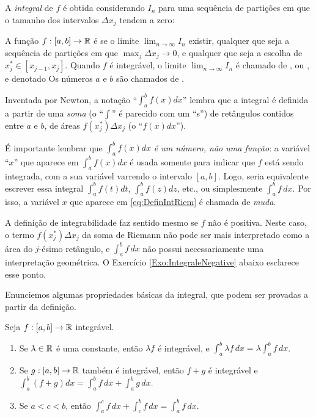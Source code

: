 A \emph{integral} de $f$ é obtida considerando $I_n$ para uma sequência de
partições em que o tamanho dos intervalos $\Delta x_j$
tendem a zero:
\begin{defin}
A função $f:[a,b]\to \mathbb{R}$ é  se o limite $\lim_{n\to
\infty}I_n$ existir, qualquer que seja a 
sequência de partições em que $\max_j\Delta x_j\to 0$, e
qualquer que seja a escolha de $x_j^*\in [x_{j-1},x_{j}]$. Quando $f$ é
integrável, o limite $\lim_{n\to \infty}I_n$
é chamado de , ou , e denotado
Os números $a$ e $b$ são chamados de .
\end{defin}

Inventada por Newton, 
a notação  ``$\int_a^bf(x)dx$'' lembra que a integral é definida a partir de
uma
\emph{soma} (o ``$\int$'' é parecido com um ``s'') de retângulos
contidos entre $a$ e $b$, de áreas $f(x^*_j)\Delta x_j$ (o
``$f(x)dx$''). 

\begin{obs}
É importante lembrar que $\int_a^bf(x)dx$ \emph{é um número, não uma função}:
a variável ``$x$'' que aparece em $\int_a^bf(x)dx$ é usada somente
para indicar que $f$ está sendo integrada, com a sua variável
varrendo o intervalo $[a,b]$. 
Logo, seria equivalente escrever essa
integral $\int_a^bf(t)dt$, $\int_a^bf(z)dz$, etc., ou simplesmente $\int_a^bf\,
dx$. Por isso, a variável $x$ que aparece em \eqref{eq:DefinIntRiem} é
chamada de \emph{muda}.
\end{obs}

\begin{obs} A definição de integrabilidade faz sentido mesmo se $f$ não é
positiva.
Neste caso, o termo $f(x_j^*)\Delta x_{j}$ da soma de Riemann não pode ser mais
interpretado
como a área do $j$-ésimo retângulo, e $\int_a^bf\,dx$
não possui necessariamente uma interpretação geométrica.
O Exercício \ref{Exo:IntegraleNegative} abaixo esclarece esse ponto.
\end{obs}

Enunciemos algumas propriedades básicas da integral, que podem ser provadas a
partir da definição.
\begin{pro}\label{Prop:ProprIntegral} Seja $f:[a,b]\to \mathbb{R}$ integrável.
\begin{enumerate}
 \item\label{itProprIntegr1} Se $\lambda\in \mathbb{R}$ é uma
 constante, então $\lambda f$ é
integrável, e $\int_a^b\lambda f\, dx=\lambda\int_a^bf\,dx$.
\item\label{itProprIntegr2} Se $g:[a,b]\to \mathbb{R}$ também é integrável, então 
$f+g$ é integrável e
$\int_a^b(f+g)dx=\int_a^bf\,dx+\int_a^bg\,dx$.
\item\label{itProprIntegr3} Se $a<c<b$, então
$\int_a^cf\,dx+\int_c^bf\,dx=\int_a^bf\,dx$.
\end{enumerate}
\end{pro}

